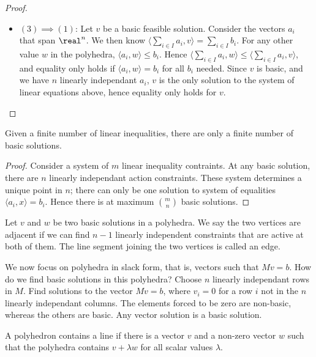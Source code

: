 \begin{proof}
\begin{itemize}
            \item $(3) \implies (1)$: Let $v$ be a basic feasible solution. Consider the vectors $a_i$ that span $\real^n$. We then know $\langle \sum_{i \in I} a_i, v \rangle = \sum_{i \in I} b_i$. For any other value $w$ in the polyhedra, $\langle a_i, w \rangle \leq b_i$. Hence $\langle \sum_{i \in I} a_i, w \rangle \leq \langle \sum_{i \in I} a_i , v \rangle$, and equality only holds if $\langle a_i, w \rangle = b_i$ for all $b_i$ needed. Since $v$ is basic, and we have $n$ linearly independant $a_i$, $v$ is the only solution to the system of linear equations above, hence equality only holds for $v$.
        \end{itemize}
    \end{proof}

    \begin{corollary}
        Given a finite number of linear inequalities, there are only a finite number of basic solutions.
    \end{corollary}
    \begin{proof}
        Consider a system of $m$ linear inequality contraints. At any basic solution, there are $n$ linearly independant action constraints. These system determines a unique point in $n$; there can only be one solution to system of equalities $\langle a_i, x \rangle = b_i$. Hence there is at maximum $\binom{m}{n}$ basic solutions.
    \end{proof}

    \begin{definition}
        Let $v$ and $w$ be two basic solutions in a polyhedra. We say the two vertices are adjacent if we can find $n-1$ linearly independent constraints that are active at both of them. The line segment joining the two vertices is called an edge.
    \end{definition}

    We now focus on polyhedra in slack form, that is, vectors such that $Mv = b$. How do we find basic solutions in this polyhedra? Choose $n$ linearly independant rows in $M$. Find solutions to the vector $Mv = b$, where $v_i = 0$ for a row $i$ not in the $n$ linearly independant columns. The elements forced to be zero are non-basic, whereas the others are basic. Any vector solution is a basic solution.

    \begin{definition}
        A polyhedron contains a line if there is a vector $v$ and a non-zero vector $w$ such that the polyhedra contains $v + \lambda w$ for all scalar values $\lambda$.
    \end{definition}

